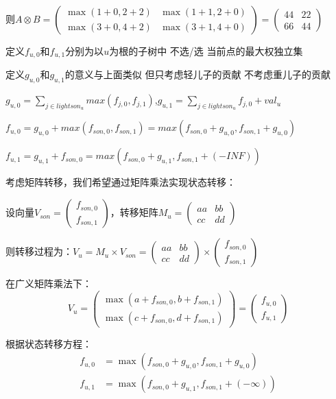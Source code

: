 \documentclass[a4paper, fontset=none]{ctexart}
\begin{document}
则$A \otimes B = \begin{pmatrix}\max(1+0, 2+2) & \max(1+1, 2+0) \\ \max(3+0, 4+2) & \max(3+1, 4+0)\end{pmatrix} = \begin{pmatrix}4 4&2 2\\6 6&4 4\end{pmatrix}$

定义$f_{u, 0}$和$f_{u, 1}$分别为以$u$为根的子树中 不选/选 当前点的最大权独立集

定义$g_{u, 0}$和$g_{u, 1}$的意义与上面类似 但只考虑轻儿子的贡献 不考虑重儿子的贡献

$g_{u, 0}=\sum\limits_{j\in lightson_u}max(f_{j, 0}, f_{j, 1})$,$g_{u, 1}={\sum\limits_{j\in lightson_u}f_{j, 0}}+val_u$

$f_{u, 0}=g_{u, 0}+max(f_{son, 0}, f_{son, 1})=max(f_{son, 0}+g_{u, 0}, f_{son, 1}+g_{u, 0})$

$f_{u, 1}=g_{u, 1}+f_{son, 0}=max(f_{son, 0}+g_{u, 1}, f_{son, 1}+(-INF))$

考虑矩阵转移，我们希望通过矩阵乘法实现状态转移：

设向量$V_{son} = \begin{pmatrix}f_{son, 0} \\ f_{son, 1}\end{pmatrix}$，转移矩阵$M_u = \begin{pmatrix}a a&b b\\c c&d d\end{pmatrix}$

则转移过程为：$V_u = M_u \times V_{son} = \begin{pmatrix}a a&b b\\c c&d d\end{pmatrix} \times \begin{pmatrix}f_{son, 0} \\ f_{son, 1}\end{pmatrix}$

在广义矩阵乘法下：
\[V_u = \begin{pmatrix}\max(a+f_{son, 0}, b+f_{son, 1}) \\ \max(c+f_{son, 0}, d+f_{son, 1})\end{pmatrix} = \begin{pmatrix}f_{u, 0} \\ f_{u, 1}\end{pmatrix}\]

根据状态转移方程：
\begin{align}
f_{u, 0} &= \max(f_{son, 0}+g_{u, 0}, f_{son, 1}+g_{u, 0}) \\
f_{u, 1} &= \max(f_{son, 0}+g_{u, 1}, f_{son, 1}+(-\infty))
\end{align}
\end{document}
